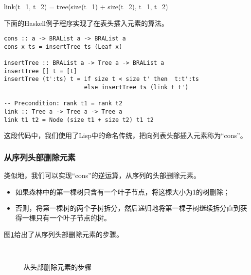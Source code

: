 \documentclass[UTF8]{article}
\begin{document}
\be
link(t_1, t_2) = tree(size(t_1) + size(t_2), t_1, t_2)
\ee

下面的Haskell例子程序实现了在表头插入元素的算法。

\begin{lstlisting}[style=Haskell]
cons :: a -> BRAList a -> BRAList a
cons x ts = insertTree ts (Leaf x)

insertTree :: BRAList a -> Tree a -> BRAList a
insertTree [] t = [t]
insertTree (t':ts) t = if size t < size t' then  t:t':ts
                       else insertTree ts (link t t')

-- Precondition: rank t1 = rank t2
link :: Tree a -> Tree a -> Tree a
link t1 t2 = Node (size t1 + size t2) t1 t2
\end{lstlisting}

这段代码中，我们使用了Lisp中的命名传统，把向列表头部插入元素称为“cons”。

\subsubsection{从序列头部删除元素}

类似地，我们可以实现“cons”的逆运算，从序列的头部删除元素。

\begin{itemize}
\item 如果森林中的第一棵树只含有一个叶子节点，将这棵大小为1的树删除；
\item 否则，将第一棵树的两个子树拆分，然后递归地将第一棵子树继续拆分直到获得一棵只有一个叶子节点的树。
\end{itemize}

图\ref{fig:bralist-pop}给出了从序列头部删除元素的步骤。

\begin{figure}[htbp]
  \centering
   \\
  \caption{从头部删除元素的步骤} \label{fig:bralist-pop}
\end{figure}
\end{document}
